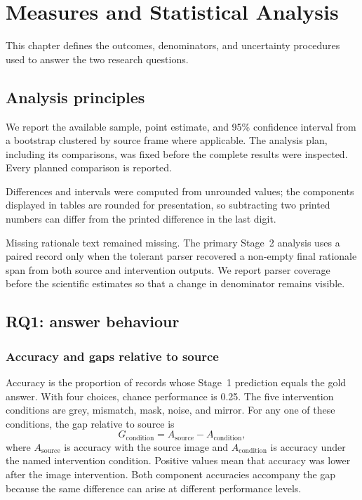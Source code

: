 
\chapter{Measures and Statistical Analysis}
\label{ch:framework}

This chapter defines the outcomes, denominators, and uncertainty procedures used
to answer the two research questions.

\section{Analysis principles}
\label{sec:framework-principles}

We report the available sample, point estimate, and 95\% confidence interval
from a bootstrap clustered by source frame where applicable. The analysis plan, including its
comparisons, was fixed before the complete results were inspected. Every planned comparison is reported.

Differences and intervals were computed from unrounded values; the components
displayed in tables are rounded for presentation, so subtracting two printed
numbers can differ from the printed difference in the last digit.

Missing rationale text remained missing. The primary Stage~2 analysis uses a
paired record only when the tolerant parser recovered a non-empty final rationale span
from both source and intervention outputs. We report parser coverage before the
scientific estimates so that a change in denominator remains visible.

\section{RQ1: answer behaviour}
\label{sec:framework-rq1}

\subsection{Accuracy and gaps relative to source}
\label{sec:framework-accuracy}

Accuracy is the proportion of records whose Stage~1 prediction equals the gold
answer. With four choices, chance performance is 0.25. The five intervention
conditions are grey, mismatch, mask, noise, and mirror. For any one of these
conditions, the gap relative to source is
\[
  G_{\mathrm{condition}}
  =A_{\mathrm{source}}-A_{\mathrm{condition}},
\]
where $A_{\mathrm{source}}$ is accuracy with the source image and
$A_{\mathrm{condition}}$ is accuracy under the named intervention condition.
Positive values mean that accuracy was lower after the
image intervention. Both component accuracies accompany the gap because the
same difference can arise at different performance levels.

